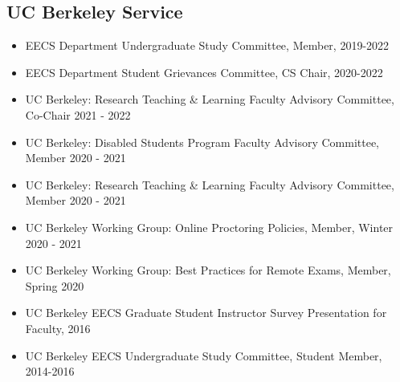 \subsection{UC Berkeley Service}

\vspace{6pt}

\begin{itemize}

  \setlength\itemsep{1em}

    \item{EECS Department Undergraduate Study Committee, Member, 2019-2022}
    
    \item{EECS Department Student Grievances Committee, CS Chair, 2020-2022}

    \item{UC Berkeley: Research Teaching & Learning Faculty Advisory Committee, Co-Chair 2021 - 2022}
    
    \item{UC Berkeley: Disabled Students Program Faculty Advisory Committee, Member 2020 - 2021}
    
    \item{UC Berkeley: Research Teaching & Learning Faculty Advisory Committee, Member 2020 - 2021}
    
    \item{UC Berkeley Working Group: Online Proctoring Policies, Member, Winter 2020 - 2021}
    
    \item{UC Berkeley Working Group: Best Practices for Remote Exams, Member, Spring 2020}
    
    \item{UC Berkeley EECS Graduate Student Instructor Survey Presentation for Faculty, 2016}
   
    \item{UC Berkeley EECS Undergraduate Study Committee, Student Member, 2014-2016}
   
\end{itemize}

\vspace{3pt}

